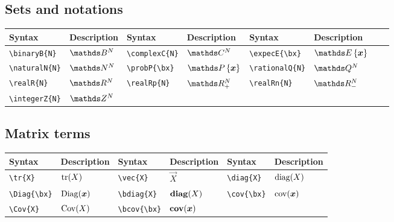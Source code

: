 \documentclass{article}
\begin{document}
	\subsection{Sets and notations}
	\begin{table}[H]
		\begin{tabular}{|l|l|l|l|l|l|l|l|}
			\hline
			Syntax	&	Description	&	Syntax	&	Description	&	Syntax	&	Description \\
			\hline
			\verb|\binaryB{N}|	&	$\binaryB{N}$	&	\verb|\complexC{N}|	&	$\complexC{N}$	&	\verb|\expecE{\bx}|	&	$\expecE{\bx}$\\
			\verb|\naturalN{N}|	&	$\naturalN{N}$	&	\verb|\probP{\bx}|	&	$\probP{\bx}$	&	\verb|\rationalQ{N}|	&	$\rationalQ{N}$\\
			\verb|\realR{N}|	&	$\realR{N}$	&	\verb|\realRp{N}|	&	$\realRp{N}$	&	\verb|\realRn{N}|	&	$\realRn{N}$\\
			\verb|\integerZ{N}|	&	$\integerZ{N}$	&		&		&		&	\\
			\hline	
		\end{tabular}
	\end{table}

	\subsection{Matrix terms}
	\begin{table}[H]
		\begin{tabular}{|l|l|l|l|l|l|}
			\hline
			Syntax	&	Description	&	Syntax	&	Description	&	Syntax	&	Description	 \\
			\hline
			\verb|\tr{X}|	&	$\mathrm{tr}(X)$	&	\verb|\vec{X}|	&	$\vec{X}$	&	\verb|\diag{X}|	&	$\mathrm{diag}(X)$ \\
			\verb|\Diag{\bx}|	&	$\mathrm{Diag}(\boldsymbol{x})$	&	\verb|\bdiag{X}|	&	$\mathbf{diag}(X)$	&	\verb|\cov{\bx}|	&	$\mathrm{cov}(\boldsymbol{x})$ \\
			\verb|\Cov{X}|	&	$\mathrm{Cov}(X)$	&	\verb|\bcov{\bx}|	&	$\mathbf{cov}(\boldsymbol{x})$ &	&	\\
			\hline	
		\end{tabular}
	\end{table}
\end{document}

